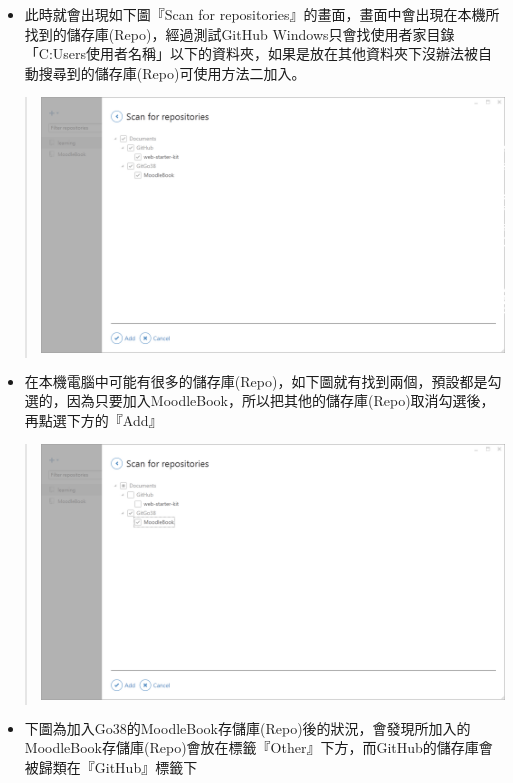 \documentclass[letterpaper,10pt,english]{sphinxmanual}
\begin{document}
\begin{itemize}
\item {} 
此時就會出現如下圖『Scan for repositories』的畫面，畫面中會出現在本機所找到的儲存庫(Repo)，經過測試GitHub Windows只會找使用者家目錄「C:Users使用者名稱」以下的資料夾，如果是放在其他資料夾下沒辦法被自動搜尋到的儲存庫(Repo)可使用方法二加入。

\end{itemize}
\begin{quote}

\includegraphics{GitHub-AddOtherGit-001.png}
\end{quote}
\begin{itemize}
\item {} 
在本機電腦中可能有很多的儲存庫(Repo)，如下圖就有找到兩個，預設都是勾選的，因為只要加入MoodleBook，所以把其他的儲存庫(Repo)取消勾選後，再點選下方的『Add』

\end{itemize}
\begin{quote}

\includegraphics{GitHub-AddOtherGit-002.png}
\end{quote}
\begin{itemize}
\item {} 
下圖為加入Go38的MoodleBook存儲庫(Repo)後的狀況，會發現所加入的MoodleBook存儲庫(Repo)會放在標籤『Other』下方，而GitHub的儲存庫會被歸類在『GitHub』標籤下

\end{itemize}
\end{document}
